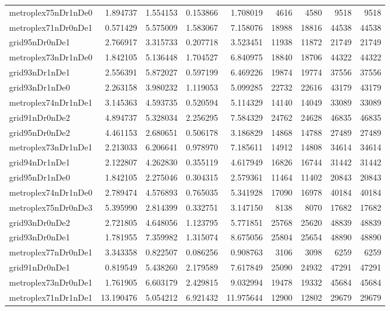 \begin{longtable}{|l|r|r|r|r|r|r|r|r|}
metroplex75nDr1nDe0 & 1.894737 & 1.554153 & 0.153866 & 1.708019 & 4616 & 4580 & 9518 & 9518 \\
metroplex71nDr0nDe1 & 0.571429 & 5.575009 & 1.583067 & 7.158076 & 18988 & 18816 & 44538 & 44538 \\
grid95nDr0nDe1 & 2.766917 & 3.315733 & 0.207718 & 3.523451 & 11938 & 11872 & 21749 & 21749 \\
metroplex73nDr1nDe0 & 1.842105 & 5.136448 & 1.704527 & 6.840975 & 18840 & 18706 & 44322 & 44322 \\
grid93nDr1nDe1 & 2.556391 & 5.872027 & 0.597199 & 6.469226 & 19874 & 19774 & 37556 & 37556 \\
grid93nDr1nDe0 & 2.263158 & 3.980232 & 1.119053 & 5.099285 & 22732 & 22616 & 43179 & 43179 \\
metroplex74nDr1nDe1 & 3.145363 & 4.593735 & 0.520594 & 5.114329 & 14140 & 14049 & 33089 & 33089 \\
grid91nDr0nDe2 & 4.894737 & 5.328034 & 2.256295 & 7.584329 & 24762 & 24628 & 46835 & 46835 \\
grid95nDr0nDe2 & 4.461153 & 2.680651 & 0.506178 & 3.186829 & 14868 & 14788 & 27489 & 27489 \\
metroplex73nDr1nDe1 & 2.213033 & 6.206641 & 0.978970 & 7.185611 & 14912 & 14808 & 34614 & 34614 \\
grid94nDr1nDe1 & 2.122807 & 4.262830 & 0.355119 & 4.617949 & 16826 & 16744 & 31442 & 31442 \\
grid95nDr1nDe0 & 1.842105 & 2.275046 & 0.304315 & 2.579361 & 11464 & 11402 & 20843 & 20843 \\
metroplex74nDr1nDe0 & 2.789474 & 4.576893 & 0.765035 & 5.341928 & 17090 & 16978 & 40184 & 40184 \\
metroplex75nDr0nDe3 & 5.395990 & 2.814399 & 0.332751 & 3.147150 & 8138 & 8070 & 17682 & 17682 \\
grid93nDr0nDe2 & 2.721805 & 4.648056 & 1.123795 & 5.771851 & 25768 & 25620 & 48839 & 48839 \\
grid93nDr0nDe1 & 1.781955 & 7.359982 & 1.315074 & 8.675056 & 25804 & 25654 & 48890 & 48890 \\
metroplex77nDr0nDe1 & 3.343358 & 0.822507 & 0.086256 & 0.908763 & 3106 & 3098 & 6259 & 6259 \\
grid91nDr0nDe1 & 0.819549 & 5.438260 & 2.179589 & 7.617849 & 25090 & 24932 & 47291 & 47291 \\
metroplex73nDr0nDe1 & 1.761905 & 6.603179 & 2.429815 & 9.032994 & 19478 & 19332 & 45684 & 45684 \\
metroplex71nDr1nDe1 & 13.190476 & 5.054212 & 6.921432 & 11.975644 & 12900 & 12802 & 29679 & 29679 \\

\end{longtable}
